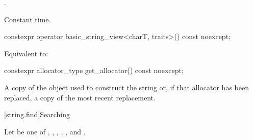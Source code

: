 \begin{itemdescr}
\pnum
\returns
{}.

\pnum
\complexity
Constant time.
\end{itemdescr}

%
\begin{itemdecl}
constexpr operator basic_string_view<charT, traits>() const noexcept;
\end{itemdecl}

\begin{itemdescr}
\pnum
\effects
Equivalent to:
\end{itemdescr}

%
\begin{itemdecl}
constexpr allocator_type get_allocator() const noexcept;
\end{itemdecl}

\begin{itemdescr}
\pnum
\returns
A copy of the
object used to construct the string or, if that allocator has been replaced, a
copy of the most recent replacement.
\end{itemdescr}

[string.find]{Searching}

\pnum
{}%
%
%
%
%
%
Let  be one of
, , , ,
, and .

